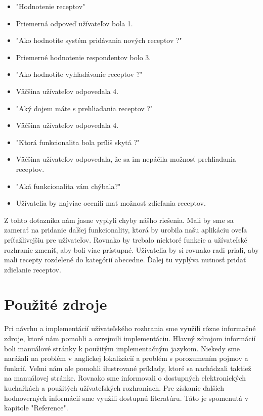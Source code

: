 \documentclass[12pt,a4paper,titlepage,final]{article}
\begin{document}
\begin{itemize}
\item "Hodnotenie receptov"
\item Priemerná odpoveď užívateľov bola 1.


\item "Ako hodnotíte systém pridávania nových receptov ?"
\item Priemerné hodnotenie respondentov bolo 3.


\item "Ako hodnotíte vyhľadávanie receptov ?"
\item Väčšina užívateľov odpovedala 4.


\item "Aký dojem máte s prehliadania receptov ?"
\item Väčšina užívateľov odpovedala 4.

\item "Ktorá funkcionalita bola príliš skytá ?"
\item Väčšina užívateľov odpovedala, že sa im nepáčila možnosť prehliadania receptov.
 
\item "Aká funkcionalita vám chýbala?"
\item Užívatelia by najviac ocenili mať možnosť zdieľania receptov. 
\end{itemize}
Z tohto dotazníka nám jasne vyplyli chyby nášho riešenia. Mali by sme sa zamerať na pridanie dalšej funkcionality, ktorá by urobila našu aplikáciu oveľa príťažlivejšiu pre užívateľov. Rovnako by trebalo niektoré funkcie a užívateľské rozhranie zmeniť, aby boli viac prístupné. Užívatelia by si rovnako radi priali, aby mali recepty rozdelené do kategórií abecedne. Ďalej tu vyplýva nutnosť pridať zdielanie receptov.


\section{Použité zdroje}
Pri návrhu a implementácií užívateľského rozhrania sme využili rôzne informačné zdroje, ktoré nám pomohli a ozrejmili implementáciu. Hlavný zdrojom informácií boli manuálové stránky k použitým implementačným jazykom. Niekedy sme narážali na problém v anglickej lokalizácií a problém s porozumením pojmov a funkcií. Veľmi nám ale pomohli ilustrované príklady, ktoré sa nachádzali taktiež na manuálovej stránke. Rovnako sme informovali o dostupných elektronických kuchařkách a použitých užívateľských rozhraniach. Pre získanie ďalších hodnoverných informácií sme využili dostupnú literatúru. Táto je spomenutá v kapitole "Reference".
\end{document}
